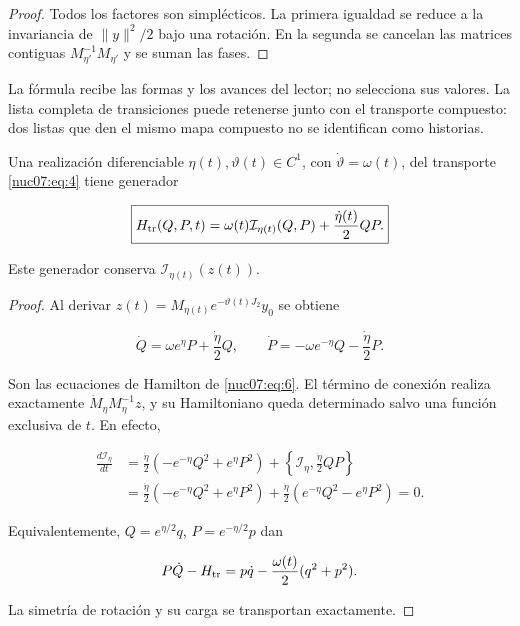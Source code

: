 \begin{proof}
Todos los factores son simplécticos. La primera igualdad se reduce a la invariancia de \(\|y\|^2/2\) bajo una rotación. En la segunda se cancelan las matrices contiguas \(M_{\eta'}^{-1}M_{\eta'}\) y se suman las fases.
\end{proof}

La fórmula recibe las formas y los avances del lector; no selecciona sus valores. La lista completa de transiciones puede retenerse junto con el transporte compuesto: dos listas que den el mismo mapa compuesto no se identifican como historias.

\begin{proposition}
Una realización diferenciable \(\eta(t),\vartheta(t)\in C^1\), con \(\dot\vartheta=\omega(t)\), del transporte \eqref{nuc07:eq:4} tiene generador

\begin{equation}
\boxed{
H_{\rm tr}(Q,P,t)=
\omega(t)\mathcal I_{\eta(t)}(Q,P)
+\frac{\dot\eta(t)}2 QP.}
\label{nuc07:eq:6}
\end{equation}

Este generador conserva \(\mathcal I_{\eta(t)}(z(t))\).
\end{proposition}

\begin{proof}
Al derivar
\(z(t)=M_{\eta(t)}e^{-\vartheta(t)J_2}y_0\) se obtiene

\[
\dot Q=\omega e^\eta P+\frac{\dot\eta}2Q,\qquad
\dot P=-\omega e^{-\eta}Q-\frac{\dot\eta}2P.
\]

Son las ecuaciones de Hamilton de \eqref{nuc07:eq:6}. El término de conexión realiza exactamente \(\dot M_\eta M_\eta^{-1}z\), y su Hamiltoniano queda determinado salvo una función exclusiva de \(t\). En efecto,

\begin{equation}
\begin{aligned}
\frac{d\mathcal I_\eta}{dt}
&=\frac{\dot\eta}{2}(-e^{-\eta}Q^2+e^\eta P^2)
+\left\{\mathcal I_\eta,\frac{\dot\eta}{2}QP\right\}\\
&=\frac{\dot\eta}{2}(-e^{-\eta}Q^2+e^\eta P^2)
+\frac{\dot\eta}{2}(e^{-\eta}Q^2-e^\eta P^2)=0.
\end{aligned}
\label{nuc07:eq:7}
\end{equation}

Equivalentemente, \(Q=e^{\eta/2}q\), \(P=e^{-\eta/2}p\) dan

\begin{equation}
P\dot Q-H_{\rm tr}
=p\dot q-\frac{\omega(t)}2(q^2+p^2).
\label{nuc07:eq:8}
\end{equation}

La simetría de rotación y su carga se transportan exactamente.
\end{proof}

